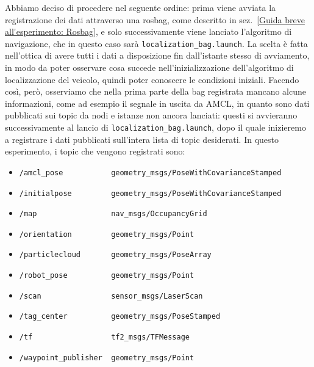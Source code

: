 Abbiamo deciso di procedere nel seguente ordine: prima viene avviata la registrazione dei dati attraverso una rosbag, come descritto in sez.~\ref{Guida breve all'esperimento: Rosbag}, e solo successivamente viene lanciato l'algoritmo di navigazione, che in questo caso sarà \verb|localization_bag.launch|. La scelta è fatta nell'ottica di avere tutti i dati a disposizione fin dall'istante stesso di avviamento, in modo da poter osservare cosa succede nell'inizializzazione dell'algoritmo di localizzazione del veicolo, quindi poter conoscere le condizioni iniziali. Facendo così, però, osserviamo che nella prima parte della bag registrata mancano alcune informazioni, come ad esempio il segnale in uscita da AMCL, in quanto sono dati pubblicati sui topic da nodi e istanze non ancora lanciati: questi si avvieranno successivamente al lancio di \verb|localization_bag.launch|, dopo il quale inizieremo a registrare i dati pubblicati sull'intera lista di topic desiderati.
In questo esperimento, i topic che vengono registrati sono:
\begin{itemize}
	\item \verb|/amcl_pose           geometry_msgs/PoseWithCovarianceStamped|
	\item \verb|/initialpose         geometry_msgs/PoseWithCovarianceStamped|
	\item \verb|/map                 nav_msgs/OccupancyGrid|                 
	\item \verb|/orientation         geometry_msgs/Point|                    
	\item \verb|/particlecloud       geometry_msgs/PoseArray|                
	\item \verb|/robot_pose          geometry_msgs/Point|                    
	\item \verb|/scan                sensor_msgs/LaserScan|                  
	\item \verb|/tag_center          geometry_msgs/PoseStamped|              
	\item \verb|/tf                  tf2_msgs/TFMessage|                    
	\item \verb|/waypoint_publisher  geometry_msgs/Point|
\end{itemize}


